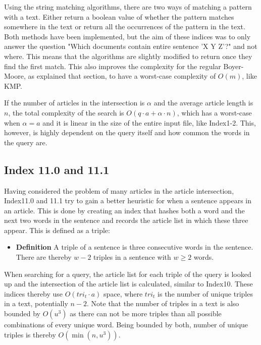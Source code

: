 Using the string matching algorithms, there are two ways of matching a pattern with a text. Either return a boolean value of whether the pattern matches somewhere in the text or return all the occurrences of the pattern in the text. Both methods have been implemented, but the aim of these indices was to only answer the question "Which documents contain entire sentence 'X Y Z'?" and not where. This means that the algorithms are slightly modified to return once they find the first match. This also improves the complexity for the regular Boyer-Moore, as explained that section, to have a worst-case complexity of $O(m)$, like KMP. 

If the number of articles in the intersection is $\alpha$ and the average article length is $n$, the total complexity of the search is $O(q\cdot a+\alpha\cdot n)$, which has a worst-case when $\alpha=a$ and it is linear in the size of the entire input file, like Index1-2. This, however, is highly dependent on the query itself and how common the words in the query are. 

\subsection{Index 11.0 and 11.1}
Having considered the problem of many articles in the article intersection, Index11.0 and 11.1 try to gain a better heuristic for when a sentence appears in an article. This is done by creating an index that hashes both a word and the next two words in the sentence and records the article list in which these three appear. This is defined as a triple:

\begin{itemize}
    \item[] \textbf{Definition} A triple of a sentence is three consecutive words in the sentence. \\There are thereby $w-2$ triples in a sentence with $w\geq2$ words.
\end{itemize}

When searching for a query, the article list for each triple of the query is looked up and the intersection of the article list is calculated, similar to Index10. These indices thereby use $O(tri_t\cdot a)$ space, where $tri_t$ is the number of unique triples in a text, potentially $n-2$. Note that the number of triples in a text is also bounded by $O(u^3)$ as there can not be more triples than all possible combinations of every unique word. Being bounded by both, number of unique triples is thereby $O(\min(n,u^3))$. 

